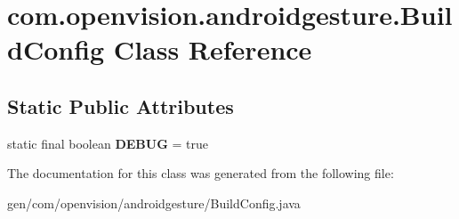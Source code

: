 \hypertarget{classcom_1_1openvision_1_1androidgesture_1_1BuildConfig}{\section{com.\-openvision.\-androidgesture.\-Build\-Config \-Class \-Reference}
\label{classcom_1_1openvision_1_1androidgesture_1_1BuildConfig}
}
\subsection*{\-Static \-Public \-Attributes}
\begin{DoxyCompactItemize}
\item 
\hypertarget{classcom_1_1openvision_1_1androidgesture_1_1BuildConfig_a281d5059186d6f9dfc79df1fb3b4273e}{static final boolean {\bfseries \-D\-E\-B\-U\-G} = true}\label{classcom_1_1openvision_1_1androidgesture_1_1BuildConfig_a281d5059186d6f9dfc79df1fb3b4273e}

\end{DoxyCompactItemize}


\-The documentation for this class was generated from the following file\-:\begin{DoxyCompactItemize}
\item 
gen/com/openvision/androidgesture/\-Build\-Config.\-java\end{DoxyCompactItemize}
